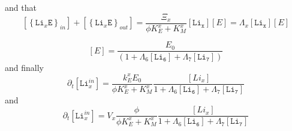 \documentclass[aps,onecolumn]{revtex4}
\newcommand{\mychem}[1]{\mathtt{#1}}
\newcommand{\myconc}[1]{\left\lbrack{#1}\right\rbrack}
\newcommand{\LiEin}[1]{\myconc{\left\lbrace\mychem{Li}_{#1}\mychem{E}\right\rbrace_{in}}}
\newcommand{\LiEout}[1]{\myconc{\left\lbrace\mychem{Li}_{#1}\mychem{E}\right\rbrace_{out}}}
\begin{document}
and that
\begin{equation}
	\LiEin{x} + \LiEout{x} = \dfrac{ \Xi_x }{\phi K_E^x + K_M^x} \myconc{\mychem{Li_x}} \myconc{E} = \Lambda_x \myconc{\mychem{Li_x}} \myconc{E}
\end{equation}

\begin{equation}
	\myconc{E} = \dfrac{E_0}{\left(1+\Lambda_6 \myconc{\mychem{Li_6}} + \Lambda_7 \myconc{\mychem{Li_7}}\right)}
\end{equation}
and finally
\begin{equation}
	\partial_t \myconc{\mychem{Li}^{in}_x} = \dfrac{k_E^x E_0}{\phi K_E^x + K_M^x} \dfrac{\myconc{Li_x}}{1+\Lambda_6 \myconc{\mychem{Li_6}} + \Lambda_7 \myconc{\mychem{Li_7}}}
\end{equation}
and
\begin{equation}
	\partial_t \myconc{\mychem{Li}^{in}_x} = V_x \dfrac{\phi}{\phi K_E^x + K_M^x}
	\dfrac{\myconc{Li_x}}{1+\Lambda_6 \myconc{\mychem{Li_6}} + \Lambda_7 \myconc{\mychem{Li_7}}}
\end{equation}
\end{document}
